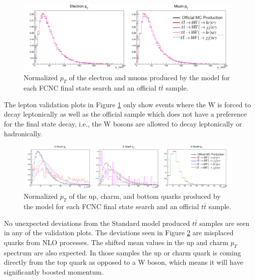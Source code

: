 \begin{figure}[h!]
	\centering
	\includegraphics[width=\columnwidth]{../ThesisImages/FCNCValidation/lepton.png}
	\caption{Normalized $p_T$ of the electron and muons produced by the model for each FCNC final state search and an official $t\bar{t}$ sample.
	}
	\label{fig:LepVal}
\end{figure} 

The lepton validation plots in Figure \ref{fig:LepVal} only show events where the W is forced to decay leptonically as well as the official sample which does not have a preference for the final state decay, i.e., the W bosons are allowed to decay leptonically or hadronically.  
\begin{figure}[h!]
	\centering
	\includegraphics[width=\columnwidth]{../ThesisImages/FCNCValidation/quarks.png}
	\caption{Normalized $p_T$ of the up, charm, and bottom quarks produced by the model for each FCNC final state search and an official $t\bar{t}$ sample.
	}
	\label{fig:QuarkVal}
\end{figure}
No unexpected deviations from the Standard model produced $t\bar{t}$ samples are seen in any of the validation plots.  The deviations seen in Figure \ref{fig:QuarkVal} are misplaced quarks from NLO processes.  The shifted mean values in the up and charm $p_T$ spectrum are also expected.  In those samples the up or charm quark is coming directly from the top quark as opposed to a W boson, which means it will have significantly boosted momentum. 

